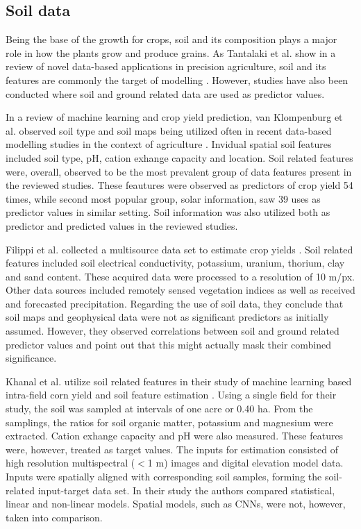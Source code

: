 \subsection{Soil data}
\label{subsec:data-soil-review}

Being the base of the growth for crops, soil and its composition plays a major role in how the plants grow and produce grains. As Tantalaki et al. show in a review of novel data-based applications in precision agriculture, soil and its features are commonly the target of modelling \cite{Tantalaki2019}. However, studies have also been conducted where soil and ground related data are used as predictor values.

In a review of machine learning and crop yield prediction, van Klompenburg et al. observed soil type and soil maps being utilized often in recent data-based modelling studies in the context of agriculture \cite{VanKlompenburg2020}. Invidual spatial soil features included soil type, pH, cation exhange capacity and location. Soil related features were, overall, observed to be the most prevalent group of data features present in the reviewed studies. These feautures were observed as predictors of crop yield 54 times, while second most popular group, solar information, saw 39 uses as predictor values in similar setting. Soil information was also utilized both as predictor and predicted values in the reviewed studies. 

Filippi et al. collected a multisource data set to estimate crop yields \cite{Filippi2019}. Soil related features included soil electrical conductivity, potassium, uranium, thorium, clay and sand content. These acquired data were processed to a resolution of 10 m/px. Other data sources included remotely sensed vegetation indices as well as received and forecasted precipitation. Regarding the use of soil data, they conclude that soil maps and geophysical data were not as significant predictors as initially assumed. However, they observed correlations between soil and ground related predictor values and point out that this might actually mask their combined significance.

Khanal et al. utilize soil related features in their study of machine learning based intra-field corn yield and soil feature estimation \cite{Khanal2018}. Using a single field for their study, the soil was sampled at intervals of one acre or 0.40 ha. From the samplings, the ratios for soil organic matter, potassium and magnesium were extracted. Cation exhange capacity and pH were also measured. These features were, however, treated as target values. The inputs for estimation consisted of high resolution multispectral ($<$1 m) images and digital elevation model data. Inputs were spatially aligned with corresponding soil samples, forming the soil-related input-target data set. In their study the authors compared statistical, linear and non-linear models. Spatial models, such as CNNs, were not, however, taken into comparison.


